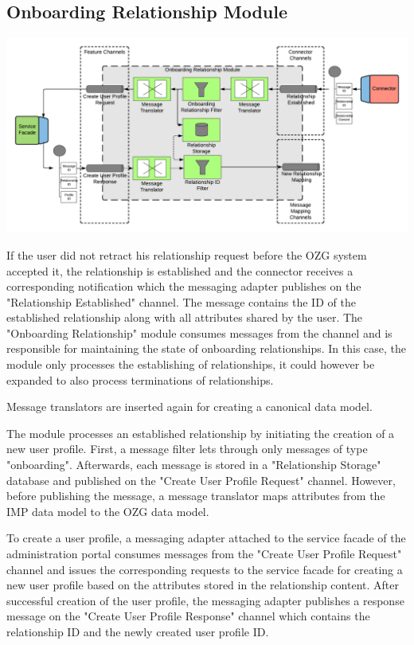 \subsection{Onboarding Relationship Module}

\begin{center}
    \includegraphics[scale=0.6]{Diagrams/Integration Architecture 1/Technological Integration/8. Onboarding Relationship Module.pdf}
\end{center}

If the user did not retract his relationship request before the OZG system accepted it, the relationship is established and the connector receives a corresponding notification which the messaging adapter publishes on the "Relationship Established" channel. The message contains the ID of the established relationship along with all attributes shared by the user. The "Onboarding Relationship" module consumes messages from the channel and is responsible for maintaining the state of onboarding relationships. In this case, the module only processes the establishing of relationships, it could however be expanded to also process terminations of relationships.

Message translators are inserted again for creating a canonical data model.

The module processes an established relationship by initiating the creation of a new user profile. First, a message filter lets through only messages of type "onboarding". Afterwards, each message is stored in a "Relationship Storage" database and published on the "Create User Profile Request" channel. However, before publishing the message, a message translator maps attributes from the IMP data model to the OZG data model.

To create a user profile, a messaging adapter attached to the service facade of the administration portal consumes messages from the "Create User Profile Request" channel and issues the corresponding requests to the service facade for creating a new user profile based on the attributes stored in the relationship content. After successful creation of the user profile, the messaging adapter publishes a response message on the "Create User Profile Response" channel which contains the relationship ID and the newly created user profile ID.

